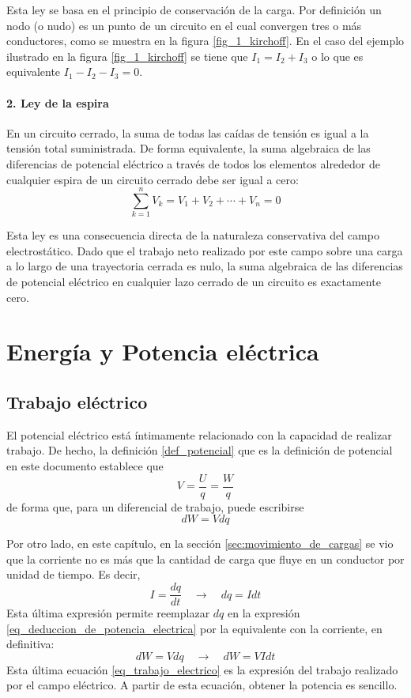 Esta ley se basa en el principio de conservación de la carga. Por definición un nodo (o nudo) es un punto de un circuito en el cual convergen tres o más conductores, como se muestra en la figura \ref{fig_1_kirchoff}. En el caso del ejemplo ilustrado en la figura \ref{fig_1_kirchoff} se tiene que \(I_1=I_2+I_3\) o lo que es equivalente \(I_1-I_2-I_3=0\).

\paragraph{2. Ley de la espira} En un circuito cerrado, la suma de todas las caídas de tensión es igual a la tensión total suministrada. De forma equivalente, la suma algebraica de las diferencias de potencial eléctrico a través de todos los elementos alrededor de cualquier espira de un circuito cerrado debe ser igual a cero:
\[
  \sum_{k=1}^n V_k = V_1 + V_2 + \cdots + V_n = 0
\]

Esta ley es una consecuencia directa de la naturaleza conservativa del campo electrostático. Dado que el trabajo neto realizado por este campo sobre una carga a lo largo de una trayectoria cerrada es nulo, la suma algebraica de las diferencias de potencial eléctrico en cualquier lazo cerrado de un circuito es exactamente cero.

\section{Energía y Potencia eléctrica}

\subsection{Trabajo eléctrico}

El potencial eléctrico está íntimamente relacionado con la capacidad de realizar trabajo. De hecho, la definición \ref{def_potencial} que es la definición de potencial en este documento establece que 
\[
  V=\frac{U}{q}=\frac{W}{q}
\]
de forma que, para un diferencial de trabajo, puede escribirse 
\begin{equation}\label{eq_deduccion_de_potencia_electrica}
  dW=Vdq
\end{equation}

Por otro lado, en este capítulo, en la sección \ref{sec:movimiento_de_cargas} se vio que la corriente no es más que la cantidad de carga que fluye en un conductor por unidad de tiempo. Es decir,
\[
  I=\frac{dq}{dt} \quad \rightarrow \quad dq=Idt
\]
Esta última expresión permite reemplazar \(dq\) en la expresión \eqref{eq_deduccion_de_potencia_electrica} por la equivalente con la corriente, en definitiva:
\begin{equation}\label{eq_trabajo_electrico}
  dW=Vdq \quad \rightarrow \quad dW=VIdt
\end{equation}
Esta última ecuación \eqref{eq_trabajo_electrico} es la expresión del trabajo realizado por el campo eléctrico. A partir de esta ecuación, obtener la potencia es sencillo.

